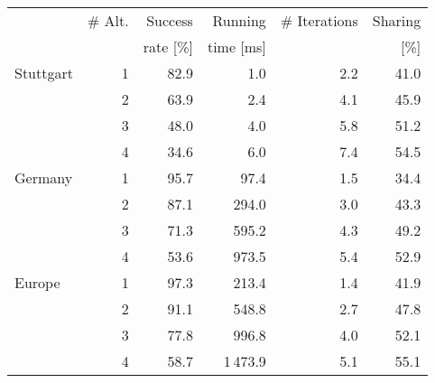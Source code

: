 \begin{tabular}{lrrrrr}
\toprule
 & \# Alt. & Success   & Running   & \# Iterations & Sharing \\
 &         & rate [\%] & time [ms] &               &    [\%] \\
\midrule
Stuttgart & 1 &     82.9 &              1.0 &        2.2 &             41.0 \\
       & 2 &     63.9 &              2.4 &        4.1 &             45.9 \\
       & 3 &     48.0 &              4.0 &        5.8 &             51.2 \\
       & 4 &     34.6 &              6.0 &        7.4 &             54.5 \\
\addlinespace Germany & 1 &     95.7 &             97.4 &        1.5 &             34.4 \\
       & 2 &     87.1 &            294.0 &        3.0 &             43.3 \\
       & 3 &     71.3 &            595.2 &        4.3 &             49.2 \\
       & 4 &     53.6 &            973.5 &        5.4 &             52.9 \\
\addlinespace Europe & 1 &     97.3 &            213.4 &        1.4 &             41.9 \\
       & 2 &     91.1 &            548.8 &        2.7 &             47.8 \\
       & 3 &     77.8 &            996.8 &        4.0 &             52.1 \\
       & 4 &     58.7 &           1\,473.9 &        5.1 &             55.1 \\
\bottomrule
\end{tabular}

